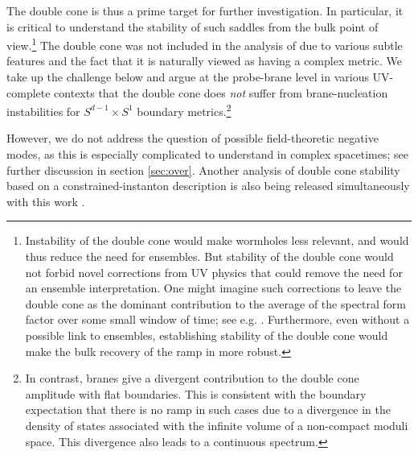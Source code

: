 \documentclass[11pt]{article}
\begin{document}
The double cone is thus a prime target for further investigation.
In particular, it is critical to understand the stability of such saddles from the bulk point of view.\footnote{
    Instability of the double cone would make wormholes less relevant, and would thus reduce the need for ensembles.
    But stability of the double cone would not forbid novel corrections from UV physics that could remove the need for an ensemble interpretation. One might imagine such corrections to leave the double cone as the dominant contribution to the average of the spectral form factor over some small window of time; see e.g. \cite{SaadTalk}.
    Furthermore, even without a possible link to ensembles, establishing stability of the double cone would make the bulk recovery of the ramp in \cite{SSS-1,Saad:2019lba,Stanford:2019vob} more robust.
}
The double cone was not included in the analysis of \cite{Marolf:2021kjc} due to various subtle features and the fact that it is naturally viewed as having a complex metric.
We take up the challenge below and argue at the probe-brane level in various UV-complete contexts that the double cone does {\it not} suffer from brane-nucleation instabilities for $S^{d-1} \times S^1$ boundary metrics.\footnote{
    In contrast, branes give a divergent contribution to the double cone amplitude with flat boundaries.  This is consistent with the boundary expectation that there is no ramp in such cases due to a divergence in the density of states associated with the infinite volume of a non-compact moduli space.  This divergence also leads to a continuous spectrum.
}

However, we do not address the question of possible field-theoretic negative modes, as this is especially complicated to understand in complex spacetimes; see further discussion in section \ref{sec:over}. 
Another analysis of double cone stability based on a constrained-instanton description is also being released simultaneously with this work \cite{CJnew}.
\end{document}
